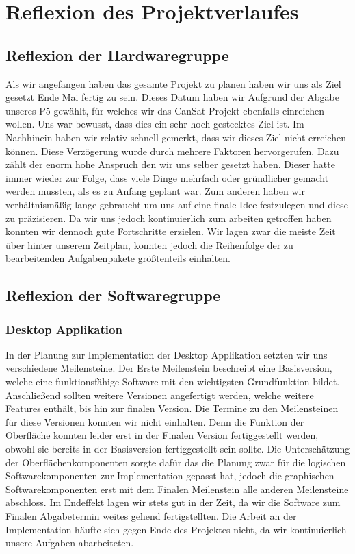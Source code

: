 \section{Reflexion des Projektverlaufes}
\subsection{Reflexion der Hardwaregruppe}
Als wir angefangen haben das gesamte Projekt zu planen haben wir uns als Ziel gesetzt Ende Mai fertig zu sein. Dieses Datum haben wir Aufgrund der Abgabe unseres P5 gewählt, für welches wir das CanSat Projekt ebenfalls einreichen wollen. Uns war bewusst, dass dies ein sehr hoch gestecktes Ziel ist. Im Nachhinein haben wir relativ schnell gemerkt, dass wir dieses Ziel nicht erreichen können. Diese Verzögerung wurde durch mehrere Faktoren hervorgerufen. Dazu zählt der enorm hohe Anspruch den wir uns selber gesetzt haben. Dieser hatte immer wieder zur Folge, dass viele Dinge mehrfach oder gründlicher gemacht werden mussten, als es zu Anfang geplant war. Zum anderen haben wir verhältnismäßig lange gebraucht um uns auf eine finale Idee festzulegen und diese zu präzisieren. Da wir uns jedoch kontinuierlich zum arbeiten getroffen haben konnten wir dennoch gute Fortschritte erzielen. Wir lagen zwar die meiste Zeit über hinter unserem Zeitplan, konnten jedoch die Reihenfolge der zu bearbeitenden Aufgabenpakete größtenteils einhalten.

\subsection{Reflexion der Softwaregruppe}
\subsubsection{Desktop Applikation}
In der Planung zur Implementation der Desktop Applikation setzten wir uns verschiedene Meilensteine. Der Erste Meilenstein beschreibt eine Basisversion, welche eine funktionsfähige Software mit den wichtigsten Grundfunktion bildet. Anschließend sollten weitere Versionen angefertigt werden, welche weitere Features enthält, bis hin zur finalen Version. Die Termine zu den Meilensteinen für diese Versionen konnten wir nicht einhalten. Denn die Funktion der Oberfläche konnten leider erst in der Finalen Version fertiggestellt werden, obwohl sie bereits in der Basisversion fertiggestellt sein sollte. Die Unterschätzung der Oberflächenkomponenten sorgte dafür das die Planung zwar für die logischen Softwarekomponenten zur Implementation gepasst hat, jedoch die graphischen Softwarekomponenten erst mit dem Finalen Meilenstein alle anderen Meilensteine abschloss. Im Endeffekt lagen wir stets gut in der Zeit, da wir die Software zum Finalen Abgabetermin weites gehend fertigstellten. Die Arbeit an der Implementation häufte sich gegen Ende des Projektes nicht, da wir kontinuierlich unsere Aufgaben abarbeiteten.

